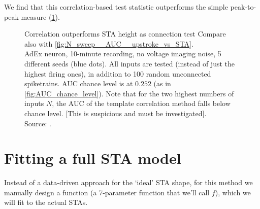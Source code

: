 We find that this correlation-based test statistic outperforms the simple peak-to-peak measure (\cref{fig:N_sweep__AUC__template-corr_vs_STA}).

\begin{figure}
    \captionn
    {Correlation outperforms STA height as connection test}
    {Compare also with \cref{fig:N_sweep__AUC__upstroke_vs_STA}.\\
    AdEx neuron, 10-minute recording, no voltage imaging noise,  5 different seeds (blue dots). All inputs are tested (instead of just the highest firing ones), in addition to 100 random unconnected spiketrains. AUC chance level is at $0.252$ (as in \cref{fig:AUC_chance_level}). Note that for the two highest numbers of inputs $N$, the AUC of the template correlation method falls below chance level. [This is suspicious and must be investigated]. \\
    Source: .}
    \label{fig:N_sweep__AUC__template-corr_vs_STA}
\end{figure}





\clearpage
\FloatBarrier
\section{Fitting a full STA model}


Instead of a data-driven approach for the `ideal' STA shape, for this method we manually design a function (a 7-parameter function that we'll call $f$), which we will fit to the actual STAs.


